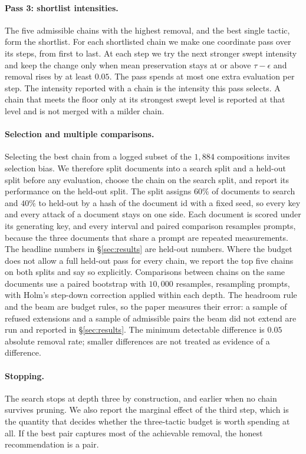 \paragraph{Pass 3: shortlist intensities.}
The five admissible chains with the highest removal, and the best single tactic, form the shortlist. For each shortlisted chain we make one coordinate pass over its steps, from first to last. At each step we try the next stronger swept intensity and keep the change only when mean preservation stays at or above $\tau - \epsilon$ and removal rises by at least $0.05$. The pass spends at most one extra evaluation per step. The intensity reported with a chain is the intensity this pass selects. A chain that meets the floor only at its strongest swept level is reported at that level and is not merged with a milder chain.

\paragraph{Selection and multiple comparisons.}
Selecting the best chain from a logged subset of the $1{,}884$ compositions invites selection bias. We therefore split documents into a search split and a held-out split before any evaluation, choose the chain on the search split, and report its performance on the held-out split. The split assigns $60\%$ of documents to search and $40\%$ to held-out by a hash of the document id with a fixed seed, so every key and every attack of a document stays on one side. Each document is scored under its generating key, and every interval and paired comparison resamples prompts, because the three documents that share a prompt are repeated measurements. The headline numbers in \S\ref{sec:results} are held-out numbers. Where the budget does not allow a full held-out pass for every chain, we report the top five chains on both splits and say so explicitly. Comparisons between chains on the same documents use a paired bootstrap with $10{,}000$ resamples, resampling prompts, with Holm's step-down correction applied within each depth. The headroom rule and the beam are budget rules, so the paper measures their error: a sample of refused extensions and a sample of admissible pairs the beam did not extend are run and reported in \S\ref{sec:results}. The minimum detectable difference is $0.05$ absolute removal rate; smaller differences are not treated as evidence of a difference.

\paragraph{Stopping.}
The search stops at depth three by construction, and earlier when no chain survives pruning. We also report the marginal effect of the third step, which is the quantity that decides whether the three-tactic budget is worth spending at all. If the best pair captures most of the achievable removal, the honest recommendation is a pair.

